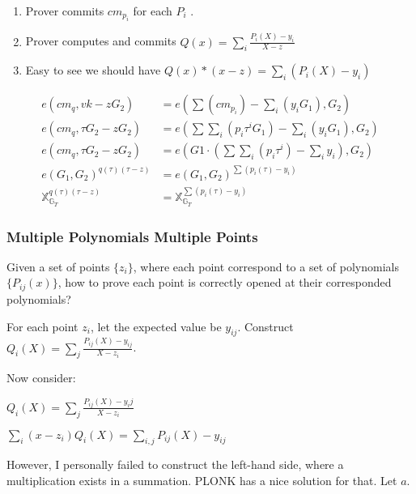 \documentclass[10pt]{article}
\begin{document}
\begin{enumerate}
    \item Prover commits $cm_{p_i}$ for each $P_i$ .
    \item Prover computes and commits $Q(x) = \sum_i{\frac{P_i(X) - y_i}{X-z}}$
    \item Easy to see we should have $Q(x) * (x-z) = \sum_i{(P_i(X) - y_i)}$
\end{enumerate}
\[
\begin{aligned}
    e({cm}_q, vk - zG_2) &= e(\sum({cm}_{p_i})-\sum_i{(y_i G_1)}, G_2)\\
    e({cm}_q, \tau G_2 - zG_2) &= e(\sum\sum_i(p_i\tau^i G_1)
                            -\sum_i{(y_i G_1)}, G_2)\\
    e({cm}_q, \tau G_2 - zG_2) &= e(G1\cdot (\sum\sum_i{(p_i\tau^i)} - \sum_i{y_i}), G_2)\\
    e(G_1, G_2)^{q(\tau)(\tau - z)} &= e(G_1,G_2)^{\sum{(p_i(\tau)-y_i)}}\\
    \mathbb{X}^{q(\tau)(\tau - z)}_{\mathbb{G}_T} &= \mathbb{X}^{\sum{(p_i(\tau)-y_i)}}_{\mathbb{G}_T}
\end{aligned}
\]
\newpage
\subsubsection{Multiple Polynomials Multiple Points}
Given a set of points $\{z_{i}\}$, where each point correspond to a set of polynomials
$\{P_{ij}(x)\}$, how to prove each point is correctly opened at their
corresponded polynomials?

For each point $z_i$, let the expected value be $y_{ij}$.
Construct $Q_i(X) = \sum_j\frac{P_{ij}(X) - y_{ij}}{X-z_i}$.

Now consider:
\begin{description}
    \item $Q_i(X) = {\sum_j\frac{P_{ij}(X) - y_ij}{X-z_i}}$
    \item $\sum_i(x-z_i) Q_i(X) = \sum_{i,j} P_{ij}(X) - y_{ij}$
\end{description}
However, I personally failed to construct the left-hand side, where a
multiplication exists in a summation. PLONK has a nice solution for that.
Let $a$.
\end{document}
